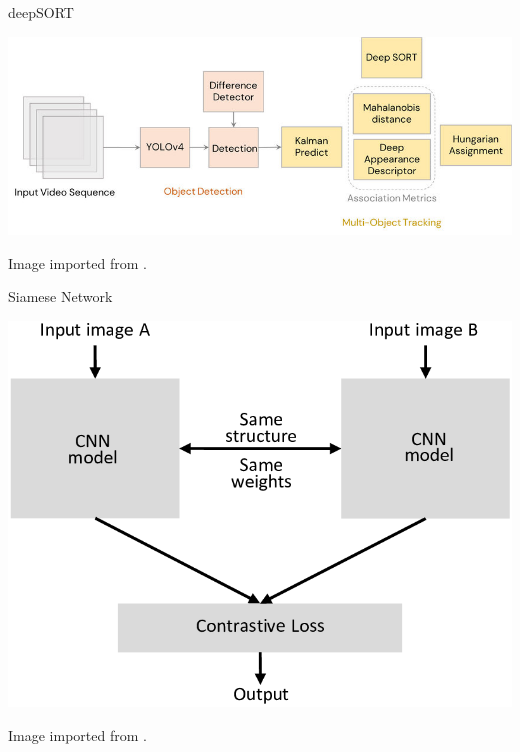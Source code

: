 \documentclass{beamer}
\newcommand{\link}[2]{\href{#1}{\textit{\color{blue}{#2}}}}%
\begin{document}
	\begin{frame}{deepSORT}
		\begin{center}
			\includegraphics[width=0.95\linewidth]{res/deepSORT.png}
		\end{center}
		Image imported from \link{https://www.researchgate.net/figure/Architecture-of-Deep-SORT-Simple-online-and-real-time-tracking-with-deep-association\_fig2\_353256407}{researchgate}.
	\end{frame}

	\begin{frame}{Siamese Network}
		\begin{center}
			\includegraphics[height=0.6\textheight]{res/siamese-network.png}
		\end{center}
		Image imported from \link{https://www.researchgate.net/figure/Structure-of-the-Siamese-network\_fig1\_327494280}{researchgate}.
	\end{frame}
\end{document}
